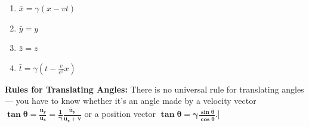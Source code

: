 \documentclass[12pt]{book}
\begin{document}
    \begin{enumerate}
        \item $\bar{x} = \gamma (x - vt)$
        \item $\bar{y} = y$
        \item $\bar{z} = z$
        \item $\bar{t} = \gamma \left( t - \frac{v}{c^2} x \right)$
    \end{enumerate}
    
    \textbf{Rules for Translating Angles:} There is no universal rule for translating angles — you have to know whether it’s an angle made by a velocity vector $\mathbf{\tan{\theta}=\frac{u_y}{u_x}=\frac{1}{\gamma}\frac{\bar{u}_y}{\bar{u}_x+v}}$ or a position vector $\mathbf{\tan{\theta}=\gamma\frac{\sin{\bar{\theta}}}{\cos{\bar{\theta}}}}$.]
    
\end{document}
